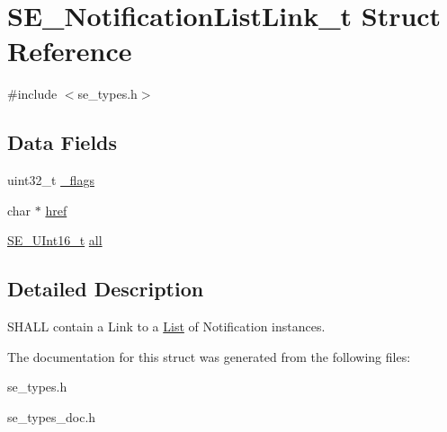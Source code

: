 \hypertarget{structSE__NotificationListLink__t}{}\section{S\+E\+\_\+\+Notification\+List\+Link\+\_\+t Struct Reference}
\label{structSE__NotificationListLink__t}


{\ttfamily \#include $<$se\+\_\+types.\+h$>$}

\subsection*{Data Fields}
\begin{DoxyCompactItemize}
\item 
uint32\+\_\+t \hyperlink{group__NotificationListLink_ga5023938637f32b603975b8a403a27bee}{\+\_\+flags}
\item 
char $\ast$ \hyperlink{group__NotificationListLink_ga5813d265b0bfb7682fca2205bd5ad8a5}{href}
\item 
\hyperlink{group__UInt16_gac68d541f189538bfd30cfaa712d20d29}{S\+E\+\_\+\+U\+Int16\+\_\+t} \hyperlink{group__NotificationListLink_ga313276d3b11f3056bd8e5ec14bcc3b12}{all}
\end{DoxyCompactItemize}


\subsection{Detailed Description}
S\+H\+A\+LL contain a Link to a \hyperlink{structList}{List} of Notification instances. 

The documentation for this struct was generated from the following files\+:\begin{DoxyCompactItemize}
\item 
se\+\_\+types.\+h\item 
se\+\_\+types\+\_\+doc.\+h\end{DoxyCompactItemize}
